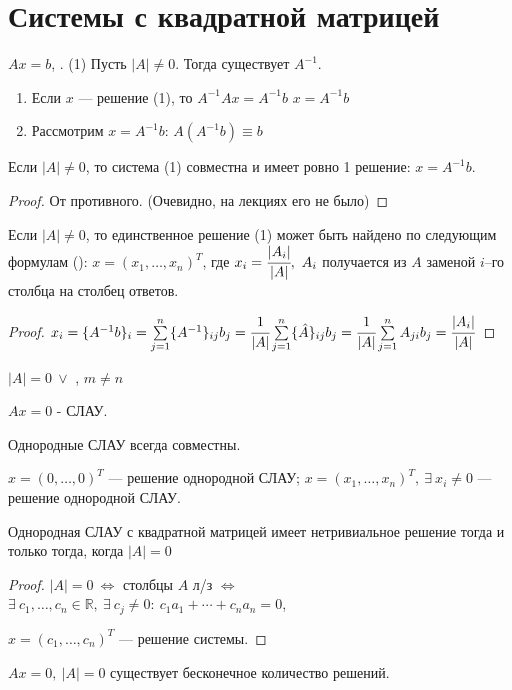 \chapter{Системы с квадратной матрицей}
$Ax=b$, . (1)
Пусть $|A|\neq0$. Тогда существует $A^{-1}$.
\begin{enumerate}
\item Если $x$ --- решение (1), то $A^{-1}Ax=A^{-1}b$ \then $x=A^{-1}b$
\item Рассмотрим $x=A^{-1}b$: $A(A^{-1}b)\equiv b$
\end{enumerate}
\begin{theor}
Если $|A|\neq0$, то система (1) совместна и имеет ровно 1 решение: $x=A^{-1}b$.
\end{theor}
\begin{proof}
От противного. (Очевидно, на лекциях его не было)
\end{proof}
\begin{theor}
Если $|A|\neq0$, то единственное решение (1) может быть найдено по следующим формулам (): $x=(x_1,\ldots,x_n)^T$, где $x_i=\cfrac{|A_i|}{|A|},\ A_i$ получается из $A$ заменой $i$--го столбца на столбец ответов.
\end{theor}
\begin{proof}
$x_i=\{A^{-1}b\}_i=\sum\limits_{j=1}^n\{A^{-1}\}_{ij}b_j=\cfrac{1}{|A|}\sum\limits_{j=1}^n\{\hat{A}\}_{ij}b_j=\cfrac{1}{|A|}\sum\limits_{j=1}^nA_{ji}b_j=\cfrac{|A_i|}{|A|}$
\end{proof}
$|A|=0\ \lor$ , $m\neq n$
\begin{opred}
$Ax=0$ -  СЛАУ.
\end{opred}
Однородные СЛАУ всегда совместны.
\begin{opred}
$x=(0,\ldots,0)^T$ ---  решение однородной СЛАУ; $x=(x_1,\ldots,x_n)^T,\ \exists\ x_i\neq0$ ---  решение однородной СЛАУ.
\end{opred}
\begin{theor}
Однородная СЛАУ с квадратной матрицей имеет нетривиальное решение тогда и только тогда, когда $|A|=0$
\end{theor}
\begin{proof}
$|A|=0\ \Leftrightarrow$ столбцы $A$ л/з $\Leftrightarrow$ $\exists\ c_1,\ldots,c_n\in\mathbb{R},\ \exists\ c_j\neq0:\ c_1a_1+\cdots+c_na_n=0$,

$x=(c_1,\ldots,c_n)^T$ --- решение системы.
\end{proof}
\begin{remark}
$Ax=0,\ |A|=0$ \then существует бесконечное количество решений.
\end{remark}
